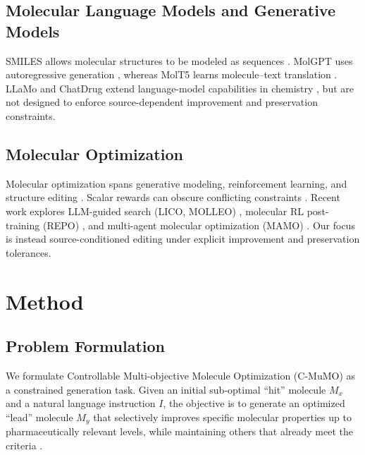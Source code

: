 \documentclass[11pt]{article}
\begin{document}
\subsection{Molecular Language Models and Generative Models}

SMILES allows molecular structures to be modeled as sequences \cite{weininger1988smiles}. MolGPT uses autoregressive generation \cite{bagal2021molgpt}, whereas MolT5 learns molecule--text translation \cite{edwards2022translationmoleculesnaturallanguage}. LLaMo and ChatDrug extend language-model capabilities in chemistry \cite{park2024llamolargelanguagemodelbased,liu2023chatgptpoweredconversationaldrugediting}, but are not designed to enforce source-dependent improvement and preservation constraints.

\subsection{Molecular Optimization}

Molecular optimization spans generative modeling, reinforcement learning, and structure editing \cite{gomez2018automatic,zhou2019optimization,olivecrona2017molecular,wang2023retrievalbasedcontrollablemoleculegeneration}. Scalar rewards can obscure conflicting constraints \cite{brown2019guacamol,wang2024multi}. Recent work explores LLM-guided search (LICO, MOLLEO) \cite{nguyen2025licolargelanguagemodels,wang2025efficientevolutionarysearchchemical}, molecular RL post-training (REPO) \cite{li2026reference}, and multi-agent molecular optimization (MAMO) \cite{zeng2026mamo}. Our focus is instead source-conditioned editing under explicit improvement and preservation tolerances.







\section{Method}

\subsection{Problem Formulation}

We formulate Controllable Multi-objective Molecule Optimization (C-MuMO) as a constrained generation task. Given an initial sub-optimal ``hit'' molecule $M_x$ and a natural language instruction $I$, the objective is to generate an optimized ``lead'' molecule $M_y$ that selectively improves specific molecular properties up to pharmaceutically relevant levels, while maintaining others that already meet the criteria \cite{dey2025large}.
\end{document}
